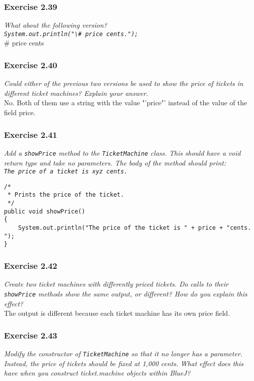 \subsubsection*{Exercise 2.39}
\textit{What about the following version? \\
\lstinline?System.out.println("\# price cents.");?}\\
\# price cents

\subsubsection*{Exercise 2.40}
\textit{Could either of the previous two versions be used to show the price of 
tickets in different ticket machines? Explain your answer. }\\
No. Both of them use a string with the value "'price"' instead of the value of 
the field price. 

\subsubsection*{Exercise 2.41}
\textit{Add a \lstinline?showPrice? method to the \lstinline?TicketMachine? 
class. This should have a void return type and take no parameters. The body of 
the method should print: \\
\lstinline?The price of a ticket is xyz cents. ?}\\
\begin{lstlisting}
/* 
 * Prints the price of the ticket. 
 */
public void showPrice()
{
	System.out.println("The price of the ticket is " + price + "cents. ");
}
\end{lstlisting}

\subsubsection*{Exercise 2.42}
\textit{Create two ticket machines with differently priced tickets. Do calls 
to their \lstinline?showPrice? methods show the same output, or different? How 
do you explain this effect? }\\
The output is different because each ticket machine has its own price field. 

\subsubsection*{Exercise 2.43}
\textit{Modify the constructor of \lstinline?TicketMachine? so that it no 
longer has a parameter. Instead, the price of tickets should be fixed at 1,000 
cents. What effect does this have when you construct ticket.machine objects 
within BlueJ? }\\

